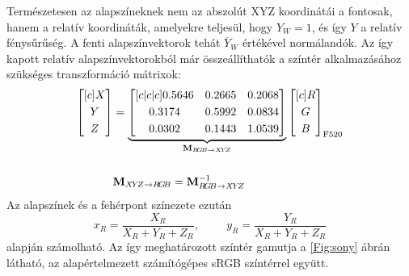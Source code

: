 Természetesen az alapszíneknek nem az abszolút XYZ koordinátái a fontosak, hanem a relatív koordináták, amelyekre teljesül, hogy $Y_W=1$, és így $Y$ a relatív fénysűrűség.
A fenti alapszínvektorok tehát $\overline{Y}_W$ értékével normálandók.
Az így kapott relatív alapszínvektorokból már összeállíthatók a színtér alkalmazásához szükséges transzformáció mátrixok:
\begin{align}
\begin{split}
\begin{bmatrix}[c]
       X \\[0.3em]
       Y \\[0.3em]
       Z \end{bmatrix} &= 
     \underbrace{ \begin{bmatrix}[c|c|c]
       0.5646 &  0.2665 &  0.2068 \\[0.3em]
       0.3174 &  0.5992 &  0.0834 \\[0.3em]
       0.0302 &  0.1443 &  1.0539 \end{bmatrix} }_{\mathbf{M}_{R\!G\!B \rightarrow X\!Y\!Z}}
\begin{bmatrix}[c]
       R \\[0.3em]
       G \\[0.3em]
       B \end{bmatrix}_{\mathrm{F}520}
\\ \vspace{1mm} \\
&\mathbf{M}_{X\!Y\!Z \rightarrow   R\!G\!B} = \mathbf{M}_{R\!G\!B \rightarrow X\!Y\!Z}^{-1}
\end{split}
\end{align}
Az alapszínek és a fehérpont színezete ezután
\begin{equation}
x_R = \frac{X_R}{X_R + Y_R + Z_R}, \hspace{1cm} y_R = \frac{Y_R}{X_R + Y_R + Z_R}
\end{equation}
alapján számolható.
Az így meghatározott színtér gamutja a \ref{Fig:sony} ábrán látható, az alapértelmezett számítógépes sRGB színtérrel együtt.

